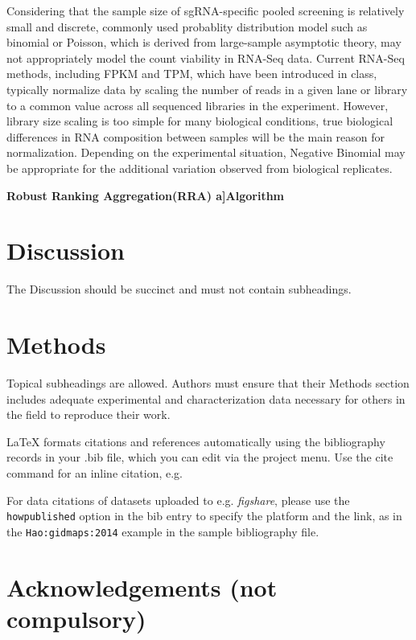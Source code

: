 \documentclass[fleqn,10pt]{wlscirep}
\begin{document}
Considering that the sample size of sgRNA-specific pooled screening is relatively small and discrete, commonly used probablity distribution model such as binomial or Poisson, which is derived from large-sample asymptotic theory, may not appropriately model the count viability in RNA-Seq data.\cite{di2011nbp} Current RNA-Seq methods, including FPKM and TPM, which have been introduced in class, typically normalize data by scaling the number of reads in a given lane or library to a common value across all sequenced libraries in the experiment.  However, library size scaling is too simple for many biological conditions, true biological differences in RNA composition between samples will be the main reason for normalization.  Depending on the experimental situation, Negative Binomial may be appropriate for the additional variation observed from biological replicates\cite{robinson2010scaling}.

\textbf{Robust Ranking Aggregation(RRA) a]Algorithm}
\section*{Discussion}

The Discussion should be succinct and must not contain subheadings.

\section*{Methods}

Topical subheadings are allowed. Authors must ensure that their Methods section includes adequate experimental and characterization data necessary for others in the field to reproduce their work.



\noindent LaTeX formats citations and references automatically using the bibliography records in your .bib file, which you can edit via the project menu. Use the cite command for an inline citation, e.g. 

For data citations of datasets uploaded to e.g. \emph{figshare}, please use the \verb|howpublished| option in the bib entry to specify the platform and the link, as in the \verb|Hao:gidmaps:2014| example in the sample bibliography file.

\section*{Acknowledgements (not compulsory)}
\end{document}
